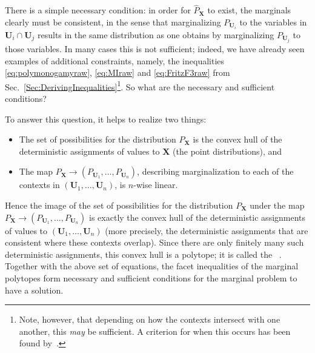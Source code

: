 There is a simple necessary condition: in order for $\hat{P}_{\bm{X}}$ to exist, the marginals clearly must be consistent, in the sense that marginalizing $P_{\bm{U}_i}$ to the variables in $\bm{U}_i\cap\bm{U}_j$ results in the same distribution as one obtains by marginalizing $P_{\bm{U}_j}$ to those variables.  
 In many cases this is not sufficient; indeed, we have already seen examples of additional constraints, namely, the inequalities \eqref{eq:polymonogamyraw}, \eqref{eq:MIraw} and \eqref{eq:FritzF3raw} from Sec.~\ref{Sec:DerivingInequalities}\footnote{Note, however, that depending on how the contexts intersect with one another, this \emph{may} be sufficient. A criterion for when this occurs has been found by~\citet{vorobev_extension_1960}.}. So what are the necessary and sufficient conditions?

To answer this question, it helps to realize two things:
\begin{itemize}
	\item The set of possibilities for the distribution $P_{\bm{X}}$ is the convex hull of the deterministic assignments of values to $\bm{X}$ (the point distributions), and 
	\item The map $P_{\bm{X}}\to (P_{\bm{U}_1},\ldots,P_{\bm{U}_n})$, describing marginalization to each of the contexts in $(\bm{U}_1,\ldots,\bm{U}_n)$, is $n$-wise linear.
\end{itemize}
Hence the image of the set of possibilities for the distribution $P_{\bm{X}}$ under the map $P_{\bm{X}}\to (P_{\bm{U}_1},\ldots,P_{\bm{U}_n})$ is exactly the convex hull of the deterministic assignments of values to $(\bm{U}_1,\ldots,\bm{U}_n)$ (more precisely, the deterministic assignments that are consistent where these contexts overlap). Since there are only finitely many such deterministic assignments, this convex hull is a polytope; it is called the ~\cite{kahle_marginal_2010}. Together with the above set of equations, the facet inequalities of the marginal polytopes form necessary and sufficient conditions for the marginal problem to have a solution.



